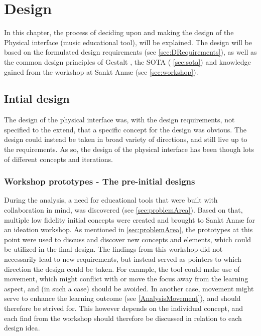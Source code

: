 \chapter{Design}

In this chapter, the process of deciding upon and making the design of the Physical interface (music educational tool), will be explained. The design will be based on the formulated design requirements (see \autoref{sec:DRequirements}), as well as the common design principles of Gestalt \cite{gestalt}, the SOTA ( \autoref{sec:sota}) and knowledge gained from the workshop at Sankt Annæ (see \autoref{sec:workshop}). 


\section{Intial design}
The design of the physical interface was, with the design requirements, not specified to the extend, that a specific concept for the design was obvious. The design could instead be taken in broad variety of directions, and still live up to the requirements. As so, the design of the physical interface has been though lots of different concepts and iterations. 

\subsection {Workshop prototypes - The pre-initial designs}

During the analysis, a need for educational tools that were built with collaboration in mind, was discovered (see \autoref{sec:problemArea}). Based on that, multiple low fidelity initial concepts were created and brought to Sankt Annæ for an ideation workshop. As mentioned in \autoref{sec:problemArea}, the prototypes at this point were used to discuss and discover new concepts and elements, which could be utilized in the final design. The findings from this workshop did not necessarily lead to new requirements, but instead served as pointers to which direction the design could be taken. For example, the tool could make use of movement, which might conflict with or move the focus away from the learning aspect, and (in such a case) should be avoided. In another case, movement might serve to enhance the learning outcome (see \autoref{AnalysisMovement}), and should therefore be strived for. This however depends on the individual concept, and each find from the workshop should therefore be discussed in relation to each design idea.\\\\

